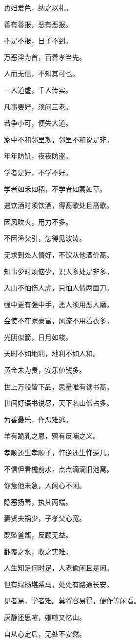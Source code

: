 \documentclass[12pt,oneside]{book}
\begin{document}
贞妇爱色，纳之以礼。

善有善报，恶有恶报。

不是不报，日子不到。

万恶淫为首，百善孝当先。

人而无信，不知其可也。

一人道虚，千人传实。

凡事要好，须问三老。

若争小可，便失大道。

家中不和邻里欺，邻里不和说是非。

年年防饥，夜夜防盗。

学者是好，不学不好。

学者如禾如稻，不学者如蒿如草。

遇饮酒时须饮酒，得髙歌处且髙歌。

因风吹火，用力不多。

不因渔父引，怎得见波涛。

无求到处人情好，不饮从他酒价髙。

知事少时烦恼少，识人多处是非多。

入山不怕伤人虎，只怕人情两面刀。

强中更有强中手，恶人须用恶人磨。

会使不在家豪富，风流不用着衣多。

光阴似箭，日月如梭。

天时不如地利，地利不如人和。

黄金未为贵，安乐値钱多。

世上万般皆下品，思量唯有读书髙。

世间好语书说尽，天下名山僧占多。

为善最乐，作恶难逃。

羊有跪乳之恩，鸦有反哺之义。

孝顺还生孝顺子，忤逆还生忤逆儿。

不信但看檐前水，点点滴滴旧池窝。

你急他未急，人闲心不闲。

隐恶扬善，执其两端。

妻贤夫祸少，子孝父心宽。

既坠釜甑，反顾无益。

翻覆之水，收之实难。

人生知足何时足，人老偸闲且是闲。

但有绿杨堪系马，处处有路通长安。

见者易，学者难。莫将容易得，便作等闲看。

厌静还思喧，嫌喧又忆山。

自从心定后，无处不安然。
\end{document}
